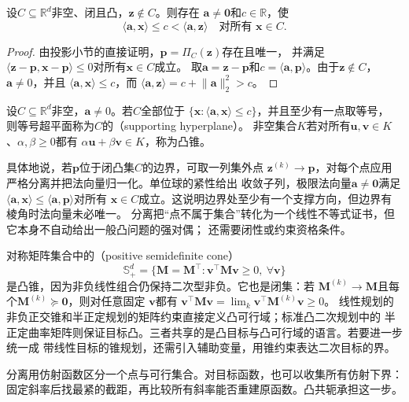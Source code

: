 \begin{theorem}[闭凸集外一点的严格分离]
\label{thm:opt-projection-separation}
设$C\subseteq\mathbb{R}^d$非空、闭且凸，$\bm{z}\notin C$。则存在
$\bm{a}\neq\bm{0}$和$c\in\mathbb{R}$，使
\[
  \langle\bm{a},\bm{x}\rangle\leq c
  <\langle\bm{a},\bm{z}\rangle
  \quad\text{对所有 }\bm{x}\in C.
\]
\end{theorem}

\begin{proof}
由投影小节的直接证明，$\bm p=\Pi_C(\bm z)$存在且唯一，
并满足$\langle\bm z-\bm p,\bm x-\bm p\rangle\leq0$对所有$\bm x\in C$成立。
取$\bm a=\bm z-\bm p$和$c=\langle\bm a,\bm p\rangle$。由于$\bm z\notin C$，
$\bm a\neq0$，并且
$\langle\bm{a},\bm{x}\rangle\leq c$，而
$\langle\bm{a},\bm{z}\rangle=c+\lVert\bm{a}\rVert_2^2>c$。
\end{proof}

\begin{definition}[支撑超平面与凸锥]
\label{def:opt-supporting-hyperplane-cone}
设$C\subseteq\mathbb R^d$非空，$\bm a\neq0$。若$C$全部位于
$\{\bm x:\langle\bm a,\bm x\rangle\leq c\}$，并且至少有一点取等号，
则等号超平面称为$C$的（supporting hyperplane）。
非空集合$K$若对所有$\bm u,\bm v\in K$、$\alpha,\beta\geq0$都有
$\alpha\bm u+\beta\bm v\in K$，称为凸锥。
\end{definition}
具体地说，若$\bm{p}$位于闭凸集$C$的边界，可取一列集外点
$\bm{z}^{(k)}\to\bm{p}$，对每个点应用严格分离并把法向量归一化。单位球的紧性给出
收敛子列，极限法向量$\bm{a}\neq\bm{0}$满足
$\langle\bm{a},\bm{x}\rangle\leq\langle\bm{a},\bm{p}\rangle$对所有
$\bm{x}\in C$成立。这说明边界处至少有一个支撑方向，但边界有棱角时法向量未必唯一。
分离把“点不属于集合”转化为一个线性不等式证书，但它本身不自动给出一般凸问题的强对偶；
还需要闭性或约束资格条件。

对称矩阵集合中的（positive semidefinite cone）
\[
  \mathbb{S}_+^d=\{\bm{M}=\bm{M}^{\top}:
  \bm{v}^{\top}\bm{M}\bm{v}\geq0,\ \forall\bm{v}\}
\]
是凸锥，因为非负线性组合仍保持二次型非负。它也是闭集：若
$\bm{M}^{(k)}\to\bm{M}$且每个$\bm{M}^{(k)}\succeq\bm{0}$，则对任意固定
$\bm{v}$都有
$\bm{v}^{\top}\bm{M}\bm{v}
=\lim_k\bm{v}^{\top}\bm{M}^{(k)}\bm{v}\geq0$。
线性规划的非负正交锥和半正定规划的矩阵约束直接定义凸可行域；标准凸二次规划中的
半正定曲率矩阵则保证目标凸。三者共享的是凸目标与凸可行域的语言。若要进一步统一成
带线性目标的锥规划，还需引入辅助变量，用锥约束表达二次目标的界。

分离用仿射函数区分一个点与可行集合。对目标函数，也可以收集所有仿射下界：
固定斜率后找最紧的截距，再比较所有斜率能否重建原函数。凸共轭承担这一步。

